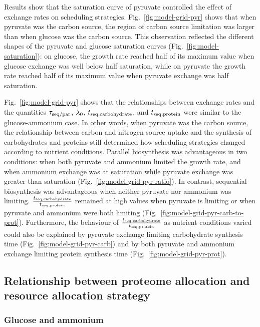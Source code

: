Results show that the saturation curve of pyruvate controlled the effect of exchange rates on scheduling strategies.
Fig.\ \ref{fig:model-grid-pyr} shows that when pyruvate was the carbon source, the region of carbon source limitation was larger than when glucose was the carbon source.
This observation reflected the different shapes of the pyruvate and glucose saturation curves (Fig.\ \ref{fig:model-saturation}): on glucose, the growth rate reached half of its maximum value when glucose exchange was well below half saturation, while on pyruvate the growth rate reached half of its maximum value when pyruvate exchange was half saturation.

Fig.\ \ref{fig:model-grid-pyr} shows that the relationships between exchange rates and the quantities $\tau_{\mathrm{seq}/\mathrm{par}}$, $\lambda_{0}$, $t_{\mathrm{seq},\mathrm{carbohydrate}}$, and $t_{\mathrm{seq},\mathrm{protein}}$ were similar to the glucose-ammonium case.
In other words, when pyruvate was the carbon source, the relationship between carbon and nitrogen source uptake and the synthesis of carbohydrates and proteins still determined how scheduling strategies changed according to nutrient conditions.
Parallel biosynthesis was advantageous in two conditions: when both pyruvate and ammonium limited the growth rate, and when ammonium exchange was at saturation while pyruvate exchange was greater than saturation (Fig.\ \ref{fig:model-grid-pyr-ratio}).
In contrast, sequential biosynthesis was advantageous when neither pyruvate nor ammonium was limiting.
$\frac{t_{\mathrm{seq},\mathrm{carbohydrate}}}{t_{\mathrm{seq},\mathrm{protein}}}$ remained at high values when pyruvate is limiting or when pyruvate and ammonium were both limiting (Fig.\ \ref{fig:model-grid-pyr-carb-to-prot}).
Furthermore, the behaviour of $\frac{t_{\mathrm{seq},\mathrm{carbohydrate}}}{t_{\mathrm{seq},\mathrm{protein}}}$ as nutrient conditions varied could also be explained by pyruvate exchange limiting carbohydrate synthesis time (Fig.\ \ref{fig:model-grid-pyr-carb}) and by both pyruvate and ammonium exchange limiting protein synthesis time (Fig.\ \ref{fig:model-grid-pyr-prot}).


\subsection{Relationship between proteome allocation and resource allocation strategy}
\label{subsec:model-rank}

\subsubsection{Glucose and ammonium}
\label{subsec:model-rank-glucose}

